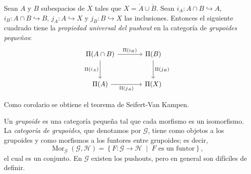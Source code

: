 \begin{teorema}[R. Brown]
Sean $A$ y $B$ subespacios de $X$ tales que $X = \mathring{A} \cup \mathring{B}$. Sean $i_A \colon A \cap B \hookrightarrow A$, $i_B \colon A \cap B \hookrightarrow B$, $j_A \colon A \hookrightarrow X$ y $j_B \colon B \hookrightarrow X$ las inclusiones. Entonces el siguiente cuadrado tiene la \textit{propiedad universal del pushout} en la categoría de \textit{grupoides pequeños}:
\[
\begin{tikzcd}[row sep=large, column sep=large]
\Pi(A \cap B) \arrow[r, "\Pi(i_B)"] \arrow[d, "\Pi(i_A)"'] & \Pi(B) \arrow[d, "\Pi(j_B)"] \\
\Pi(A) \arrow[r, "\Pi(j_A)"'] & \Pi(X)
\end{tikzcd}
\]
\end{teorema}

Como corolario se obtiene el teorema de Seifert-Van Kampen.

\begin{definicion}
Un \textit{grupoide} es una categoría pequeña tal que cada morfismo es un isomorfismo. La \textit{categoría de grupoides}, que denotamos por $\mathcal{G}$, tiene como objetos a los grupoides y como morfismos a los funtores entre grupoides; es decir,
\[
\operatorname{Mor}_{\mathcal{G}}(\mathcal{G}, \mathcal{H}) = \left\{ F \colon \mathcal{G} \to \mathcal{H} \;\middle|\; F \text{ es un funtor} \right\},
\]
el cual es un conjunto. En $\mathcal{G}$ existen los pushouts, pero en general son difíciles de definir.
\end{definicion}

